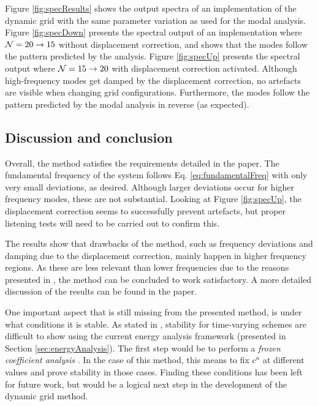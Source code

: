 Figure \ref{fig:specResults} shows the output spectra of an implementation of the dynamic grid with the same parameter variation as used for the modal analysis. Figure \ref{fig:specDown} presents the spectral output of an implementation where $\mathcal{N} = 20 \rightarrow 15$ without displacement correction, and shows that the modes follow the pattern predicted by the analysis. Figure \ref{fig:specUp} presents the spectral output where $\mathcal{N} = 15 \rightarrow 20$ with displacement correction activated. Although high-frequency modes get damped by the displacement correction, no artefacts are visible when changing grid configurations. Furthermore, the modes follow the pattern predicted by the modal analysis in reverse (as expected).

\subsection{Discussion and conclusion}\label{sec:conclusion}

Overall, the method satisfies the requirements detailed in the paper. The fundamental frequency of the system follows Eq. \eqref{eq:fundamentalFreq} with only very small deviations, as desired. Although larger deviations occur for higher frequency modes, these are not substantial. Looking at Figure \ref{fig:specUp}, the displacement correction seems to successfully prevent artefacts, but proper listening tests will need to be carried out to confirm this.

The results show that drawbacks of the method, such as frequency deviations and damping due to the displacement correction, mainly happen in higher frequency regions. As these are less relevant than lower frequencies due to the reasons presented in \citeP[G], the method can be concluded to work satisfactory. A more detailed discussion of the results can be found in the paper.  

One important aspect that is still missing from the presented method, is under what conditions it is stable. As stated in \cite{theBible}, stability for time-varying schemes are difficult to show using the current energy analysis framework (presented in Section \ref{sec:energyAnalysis}). The first step would be to perform a \textit{frozen coefficient analysis} \cite{Strikwerda1989}. In the case of this method, this means to fix $c^n$ at different values and prove stability in those cases. Finding these conditions has been left for future work, but would be a logical next step in the development of the dynamic grid method.

